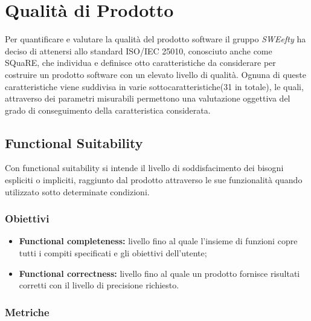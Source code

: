 \section{Qualità di Prodotto}
\label{sec:qdpr}
Per quantificare e valutare la qualità del prodotto software il gruppo \textit{SWEefty} ha deciso di attenersi allo standard ISO/IEC 25010, conosciuto anche come SQuaRE, che individua e definisce otto caratteristiche da considerare per costruire un prodotto software con un elevato livello di qualità. Ognuna di queste caratteristiche viene suddivisa in varie sottocaratteristiche(31 in totale), le quali, attraverso dei parametri misurabili  permettono una valutazione oggettiva del grado di conseguimento della caratteristica considerata.
 
	\subsection{Functional Suitability}
	Con functional suitability si intende il livello di soddisfacimento dei bisogni espliciti o impliciti, raggiunto dal prodotto attraverso le sue funzionalità quando utilizzato sotto determinate condizioni.
		\subsubsection{Obiettivi}
			\begin{itemize}
				\item {\textbf{Functional completeness:} livello fino al quale l'insieme di funzioni copre tutti i compiti specificati e gli obiettivi dell'utente;}
				\item {\textbf{Functional correctness:} livello fino al quale un prodotto fornisce risultati corretti con il livello di precisione richiesto.}
			\end{itemize}
		\subsubsection{Metriche}
